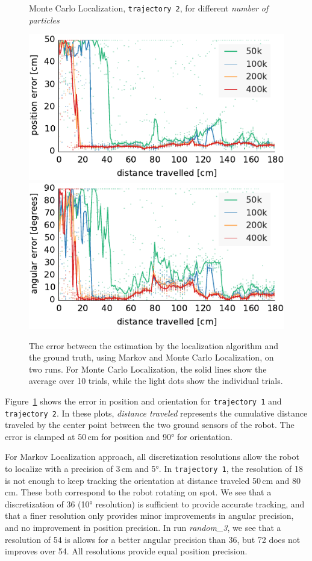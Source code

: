 \documentclass[letterpaper, 10pt, conference]{ieeeconf}
\newcommand{\Fig}[1]{Figure~\ref{fig:#1}}
\begin{document}
\begin{figure}
\begin{center}
Monte Carlo Localization, \texttt{trajectory~2}, for different \emph{number of particles}
\end{center}
\includegraphics{mcl-whole_random_2-xy}\hfill
\includegraphics{mcl-whole_random_2-theta}

\caption{The error between the estimation by the localization algorithm and the ground truth, using Markov and Monte Carlo Localization, on two runs.
For Monte Carlo Localization, the solid lines show the average over 10 trials, while the light dots show the individual trials.}
\label{fig:whole-runs-random12}
\end{figure}

\Fig{whole-runs-random12} shows the error in position and orientation for \texttt{trajectory~1} and \texttt{trajectory~2}.
In these plots, \emph{distance traveled} represents the cumulative distance traveled by the center point between the two ground sensors of the robot.
The error is clamped at 50\,cm for position and 90° for orientation.

For Markov Localization approach, all discretization resolutions allow the robot to localize with a precision of 3\,cm and 5°.
In \texttt{trajectory~1}, the resolution of 18 is not enough to keep tracking the orientation at distance traveled 50\,cm and 80\,cm.
These both correspond to the robot rotating on spot.
We see that a discretization of 36 (10° resolution) is sufficient to provide accurate tracking, and that a finer resolution only provides minor improvements in angular precision, and no improvement in position precision.
In run \emph{random\_3}, we see that a resolution of 54 is allows for a better angular precision than 36, but 72 does not improves over 54.
All resolutions provide equal position precision.
\end{document}
